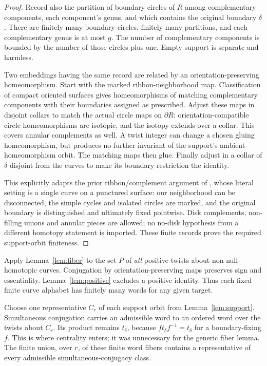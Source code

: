 \documentclass[11pt]{article}
\begin{document}
\begin{proof}
Record also the partition of boundary circles of $R$ among complementary components, each component's genus, and which contains the original boundary $\delta$. There are finitely many boundary circles, finitely many partitions, and each complementary genus is at most $g$. The number of complementary components is bounded by the number of those circles plus one. Empty support is separate and harmless.

Two embeddings having the same record are related by an orientation-preserving homeomorphism. Start with the marked ribbon-neighborhood map. Classification of compact oriented surfaces gives homeomorphisms of matching complementary components with their boundaries assigned as prescribed. Adjust these maps in disjoint collars to match the actual circle maps on $\partial R$: orientation-compatible circle homeomorphisms are isotopic, and the isotopy extends over a collar. This covers annular complements as well. A twist integer can change a chosen gluing homeomorphism, but produces no further invariant of the support's ambient-homeomorphism orbit. The matching maps then glue. Finally adjust in a collar of $\delta$ disjoint from the curves to make its boundary restriction the identity.

This explicitly adapts the prior ribbon/complement argument of \cite[Lemma 10]{CFP}, whose literal setting is a single curve on a punctured surface: our neighborhood can be disconnected, the simple cycles and isolated circles are marked, and the original boundary is distinguished and ultimately fixed pointwise. Disk complements, non-filling unions and annular pieces are allowed; no no-disk hypothesis from a different homotopy statement is imported. These finite records prove the required support-orbit finiteness.
\end{proof}

Apply Lemma~\ref{lem:fiber} to the set $P$ of \emph{all} positive twists about non-null-homotopic curves. Conjugation by orientation-preserving maps preserves sign and essentiality. Lemma~\ref{lem:positive} excludes a positive identity. Thus each fixed finite curve alphabet has finitely many words for any given target.

Choose one representative $C_r$ of each support orbit from Lemma~\ref{lem:support}. Simultaneous conjugation carries an admissible word to an ordered word over the twists about $C_r$. Its product remains $t_\delta$, because $f t_\delta f^{-1}=t_\delta$ for a boundary-fixing $f$. This is where centrality enters; it was unnecessary for the generic fiber lemma. The finite union, over $r$, of these finite word fibers contains a representative of every admissible simultaneous-conjugacy class.
\end{document}
